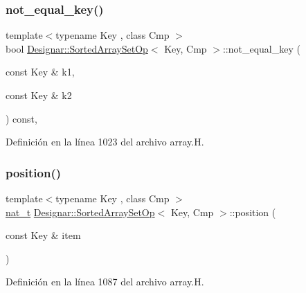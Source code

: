 \subsubsection{\texorpdfstring{not\+\_\+equal\+\_\+key()}{not\_equal\_key()}}
{\footnotesize\ttfamily template$<$typename Key , class Cmp $>$ \\
bool \hyperlink{class_designar_1_1_sorted_array_set_op}{Designar\+::\+Sorted\+Array\+Set\+Op}$<$ Key, Cmp $>$\+::not\+\_\+equal\+\_\+key (\begin{DoxyParamCaption}\item[{const Key \&}]{k1,  }\item[{const Key \&}]{k2 }\end{DoxyParamCaption}) const\hspace{0.3cm}{\ttfamily [inline]}, {\ttfamily [protected]}}



Definición en la línea 1023 del archivo array.\+H.

\mbox{\label{class_designar_1_1_sorted_array_set_op_a138b326d0002cf3ddc19a980b1ca9542}} 
\subsubsection{\texorpdfstring{position()}{position()}}
{\footnotesize\ttfamily template$<$typename Key , class Cmp $>$ \\
\hyperlink{namespace_designar_aa72662848b9f4815e7bf31a7cf3e33d1}{nat\+\_\+t} \hyperlink{class_designar_1_1_sorted_array_set_op}{Designar\+::\+Sorted\+Array\+Set\+Op}$<$ Key, Cmp $>$\+::position (\begin{DoxyParamCaption}\item[{const Key \&}]{item }\end{DoxyParamCaption})\hspace{0.3cm}{\ttfamily [inline]}}



Definición en la línea 1087 del archivo array.\+H.

\mbox{\label{class_designar_1_1_sorted_array_set_op_aa0ea019290a9b4a4777b5beb4c4d0c7d}} 
